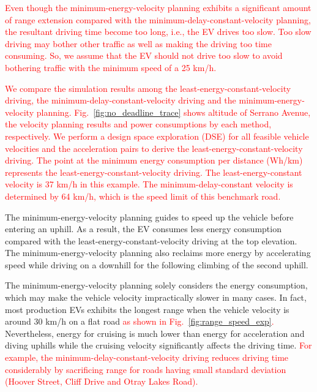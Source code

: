 \documentclass{IEEEtran}
\begin{document}
\textcolor{red}{Even though the minimum-energy-velocity planning exhibits a significant amount of range extension compared with the minimum-delay-constant-velocity planning, the resultant driving time become too long, i.e., the EV drives too slow. Too slow driving may bother other traffic as well as making the driving too time consuming. So, we assume that the EV should not drive too slow to avoid bothering traffic with the minimum speed of a 25 km/h.}

\textcolor{red}{We compare the simulation results among the least-energy-constant-velocity driving, the minimum-delay-constant-velocity driving and the minimum-energy-velocity planning. Fig.~\ref{fig:no_deadline_trace} shows altitude of Serrano Avenue, the velocity planning results and power consumptions by each method, respectively. We perform a design space exploration (DSE) for all feasible vehicle velocities and the acceleration pairs to derive the least-energy-constant-velocity driving. The point at the minimum energy consumption per distance (Wh/km) represents the least-energy-constant-velocity driving. The least-energy-constant velocity is 37 km/h in this example. The minimum-delay-constant velocity is determined by 64 km/h, which is the speed limit of this benchmark road.}

The minimum-energy-velocity planning guides to speed up the vehicle before entering an uphill. As a result, the EV consumes less energy consumption compared with the least-energy-constant-velocity driving at the top elevation. The minimum-energy-velocity planning also reclaims more energy by accelerating speed while driving on a downhill for the following climbing of the second uphill. 

The minimum-energy-velocity planning solely considers the energy consumption, which may make the vehicle velocity impractically slower in many cases. In fact, most production EVs exhibits the longest range when the vehicle velocity is around 30 km/h on a flat road \textcolor{red}{as shown in Fig.~\ref{fig:range_speed_exp}.} Nevertheless, energy for cruising is much lower than energy for acceleration and diving uphills while the cruising velocity significantly affects the driving time. \textcolor{red}{For example, the minimum-delay-constant-velocity driving reduces driving time considerably by sacrificing range for roads having small standard deviation (Hoover Street, Cliff Drive and Otray Lakes Road).}
\end{document}
